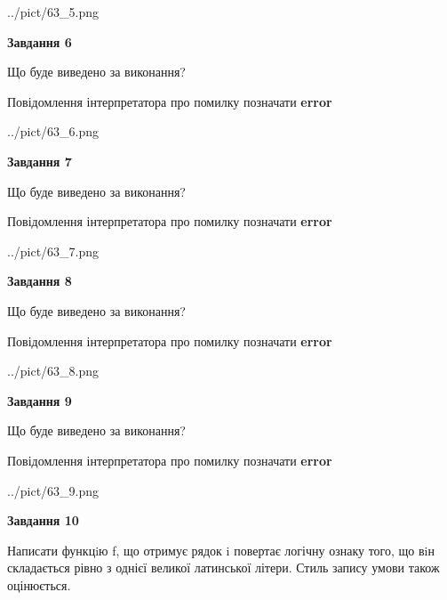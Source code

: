 \documentclass[12pt, ukrainian]{article}
\begin{document}
{\begin {large}
\begin{center}
	{../pict/63_5.png}
\end{center}
\newpage

{\begin {center}\textbf{Завдання 6}\end {center}}\par
Що буде виведено за виконання? \par
Повідомлення інтерпретатора про помилку позначати \textbf{error}

\begin{center}
	{../pict/63_6.png}
\end{center}
\newpage

{\begin {center}\textbf{Завдання 7}\end {center}}\par
Що буде виведено за виконання? \par
Повідомлення інтерпретатора про помилку позначати \textbf{error}

\begin{center}
	{../pict/63_7.png}
\end{center}
\newpage

{\begin {center}\textbf{Завдання 8}\end {center}}\par
Що буде виведено за виконання? \par
Повідомлення інтерпретатора про помилку позначати \textbf{error}

\begin{center}
	{../pict/63_8.png}
\end{center}
\newpage

{\begin {center}\textbf{Завдання 9}\end {center}}\par
Що буде виведено за виконання? \par
Повідомлення інтерпретатора про помилку позначати \textbf{error}

\begin{center}
	{../pict/63_9.png}
\end{center}
\newpage

{\begin {center}\textbf{Завдання 10}\end {center}}\par

Написати функцiю f, що отримує рядок i повертає логічну ознаку того, що вiн складається рівно з однієї великої латинської літери. Стиль запису умови також оцінюється.\par
\newpage

\end {large}}
\end{document}
